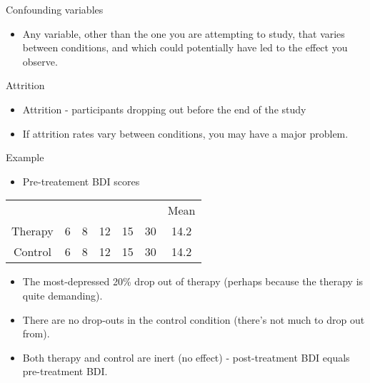 \documentclass{beamer}
\begin{document}
\begin{frame}{Confounding variables}
\begin{itemize}
\item Any variable, other than the one you are attempting to study, that varies between conditions, and which could potentially have led to the effect you observe.
\end{itemize}
\end{frame}

\begin{frame}{Attrition}
\begin{itemize}
\item Attrition - participants dropping out before the end of the study
\item If attrition rates vary between conditions, you may have a major problem.
\end{itemize}
\end{frame}

\begin{frame}{Example}
\begin{itemize}
\item Pre-treatement BDI scores
\end{itemize}
\begin{tabular} {c c c c c c c}
 &  &  &  &  &  & Mean \\
Therapy	& 6 & 8	& 12 & 15 & 30 & 14.2 \\
Control	& 6 & 8	& 12 & 15 & 30 & 14.2 \\
\end{tabular} 
\vspace{12 pt}
\begin{itemize}
\item The most-depressed 20\% drop out of therapy (perhaps because the therapy is quite demanding).
\item There are no drop-outs in the control condition (there's not much to drop out from).
\item Both therapy and control are inert (no effect) - post-treatment BDI equals pre-treatment BDI.
\end{itemize}
\end{frame}
\end{document}
